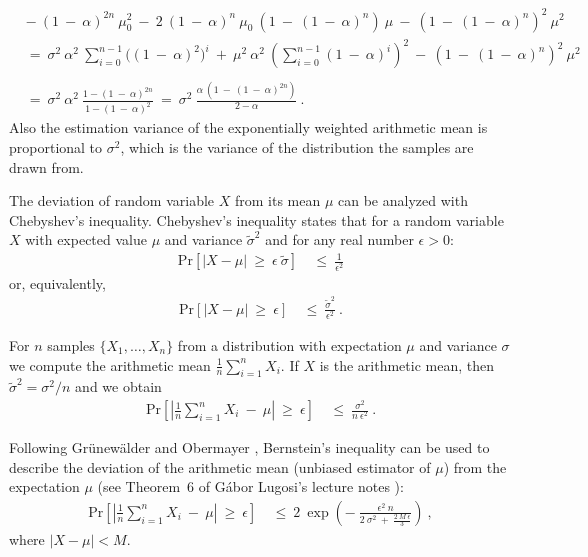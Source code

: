 \documentclass{article}
\newcommand\PR{\mathbf{\mathrm{Pr}}}
\renewcommand{\leq}{\leqslant}
\renewcommand{\geq}{\geqslant}
\begin{document}
\begin{appendices}
\begin{align}
    &- \ (1 \ - \ \alpha)^{2n} \ \mu_0^2 \ - \ 2 \ (1 \ - \ \alpha)^{n} \ \mu_0 \ (1 \ - \  (1 \ - \ \alpha)^{n} ) \ \mu \ - \ (1 \ - \  (1 \ - \ \alpha)^{n} )^2 \ \mu^2 \\ \nonumber
  &= \  \sigma^2 \ \alpha^2 \ \sum_{i=0}^{n-1}
    \big((1\ - \ \alpha)^2\big)^{i} \ + \ \mu^2   \ \alpha^2 \ \left(\sum_{i=0}^{n-1}
    (1 \ - \ \alpha)^i \right)^2 \ - \ (1 \ - \  (1 \ - \ \alpha)^{n} )^2 \ \mu^2 
 \\ \nonumber
  \\ \nonumber
  &= \  \sigma^2 \ \alpha^2 \
  \frac{1-(1\ - \ \alpha)^{2n}}{1-(1 \ - \ \alpha)^2} \ = \ \sigma^2 \ 
  \frac{\alpha \ (1 \ - \ (1 \ - \ \alpha)^{2n})}{2-\alpha} \ .
\end{align}
Also the estimation variance of the exponentially weighted arithmetic mean is proportional to $\sigma^2$,
which is the variance of the distribution the samples are drawn from.

The deviation of random variable $X$ from its
mean $\mu$ can be analyzed with Chebyshev's inequality.
Chebyshev's inequality \cite{Bienayme:53,Chebyshev:67} states that for 
a random variable $X$ with expected value $\mu$
and variance $\tilde{\sigma}^2$ and for any real number $\epsilon > 0$:
\begin{align}
 \PR \left[|X-\mu| \ \geq \ \epsilon \ \tilde{\sigma} \right] \ &\leq \ \frac{1}{\epsilon^2} 
\end{align}
or, equivalently,
\begin{align}
 \PR \left[|X-\mu| \ \geq \ \epsilon  \right] \ &\leq \ \frac{\tilde{\sigma}^2}{\epsilon^2}
 \ .
\end{align}

For $n$ samples $\{X_1,\ldots,X_n\}$ from a distribution with expectation
$\mu$ and variance $\sigma$ we compute the arithmetic mean
$\frac{1}{n} \sum_{i=1}^n X_i$.
If $X$ is the arithmetic mean, then
$\tilde{\sigma}^2=\sigma^2/n$ and we obtain
\begin{align}
  \PR \left[\left|\frac{1}{n} \sum_{i=1}^n X_i \ - \ \mu \right|
    \ \geq \ \epsilon  \right] \ &\leq \
 \frac{\sigma^2}{n \ \epsilon^2} \ .
\end{align}



Following Gr{\"{u}}new{\"{a}}lder and Obermayer \cite{Grunewalder:11},
Bernstein's inequality can be used to describe the deviation of
the arithmetic mean (unbiased estimator of $\mu$)
from the expectation $\mu$
(see Theorem~6 of G{\'{a}}bor Lugosi's
lecture notes \cite{Lugosi:03}):
\begin{align}
  \PR \left[\left|\frac{1}{n} \sum_{i=1}^n X_i \ - \ \mu \right|
    \ \geq \ \epsilon \right] \ &\leq \
  2 \ \exp \left( - \ \frac{\epsilon^2 \ n}
    {2\ \sigma^2 \ + \ \frac{2\ M \ \epsilon}{3}} \right) \ ,
\end{align}
where $|X  -  \mu |<M$.



\end{appendices}
\end{document}
